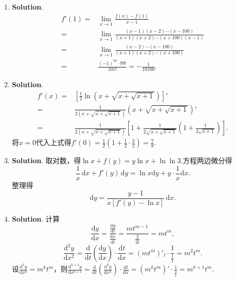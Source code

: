 \documentclass[../main.tex]{subfiles}
\begin{document}
\begin{enumerate}
    \item \textbf{Solution}.
          \[
              \begin{aligned}
                  f'(1) = {} & \lim_{x\to1}\frac{f(x)-f(1)}{x-1}                                        \\
                  = {}       & \lim_{x\to1}\frac{(x-1)(x-2)\cdots(x-100)}{(x+1)(x+2)\cdots(x+100)(x-1)} \\
                  = {}       & \lim_{x\to1}\frac{(x-2)\cdots(x-100)}{(x+1)(x+2)\cdots(x+100)}           \\
                  = {}       & \frac{(-1)^{99}\cdot 99!}{101!}=-\frac{1}{10100}.
              \end{aligned}
          \]

    \item \textbf{Solution}.
          \[
              \begin{aligned}
                  f'(x) = {} & \left[\frac{1}{2}\ln\left(x+\sqrt{x+\sqrt{x+1}}\right)\right]'                                                                  \\
                  = {}       & \frac{1}{2\left(x+\sqrt{x+\sqrt{x+1}}\right)}\left(x+\sqrt{x+\sqrt{x+1}}\right)'                                                \\
                  = {}       & \frac{1}{2\left(x+\sqrt{x+\sqrt{x+1}}\right)}\left[1+\frac{1}{2\sqrt{x+\sqrt{x+1}}}\left(1+\frac{1}{2\sqrt{x+1}}\right)\right].
              \end{aligned}
          \]
          将$x=0$代入上式得$f'(0)=\frac{1}{2}\left(1+\frac{1}{2}\cdot\frac{3}{2}\right
              )=\frac{7}{8}$.

    \item \textbf{Solution}. 取对数，得$\ln x + f(y) = y\ln x + \ln\ln 3$.方程两边微分得
          \[
              \frac{1}{x}\,\mathrm{d}x + f'(y)\,\mathrm{d}y = \ln x \mathrm{d}y + y\cdot\frac{1}{x}
              \mathrm{d}x.
          \]
          整理得
          \[
              \mathrm{d}y=\frac{y-1}{x\left[f'(y)-\ln x\right]}\,\mathrm{d}x.
          \]

    \item \textbf{Solution}. 计算
          \[
              \frac{\mathrm{d}y}{\mathrm{d}x}=\frac{\frac{\mathrm{d}y}{\mathrm{d}t}}{\frac{\mathrm{d}x}{\mathrm{d}t}}
              =\frac{mt^{m-1}}{\frac{2}{2t}}=mt^{m},
          \]
          \[
              \frac{\mathrm{d}^{2}y}{\mathrm{d}x^{2}}=\frac{\mathrm{d}}{\mathrm{d}t}\left
              (\frac{\mathrm{d}y}{\mathrm{d}x}\right)\cdot\frac{\mathrm{d}t}{\mathrm{d}x}
              =\left(mt^{m}\right)'_{t}\cdot\frac{1}{\frac{1}{t}}=m^{2} t^{m}.
          \]
          设$\frac{\mathrm{d}^{k} y}{\mathrm{d}x^{k}}=m^{k} t^{m}$，则$\frac{\mathrm{d}^{k+1}y}{\mathrm{d}x^{k+1}}
              =\frac{\mathrm{d}}{\mathrm{d}t}\left (\frac{\mathrm{d}^{k} y}{\mathrm{d}x^{k}}
              \right)\cdot\frac{\mathrm{d}t}{\mathrm{d}x}=\left(m^{k} t^{m}\right)'\cdot\frac{1}{\frac{1}{t}}
              =m^{k+1}t^{m}$.


\end{enumerate}
\end{document}
